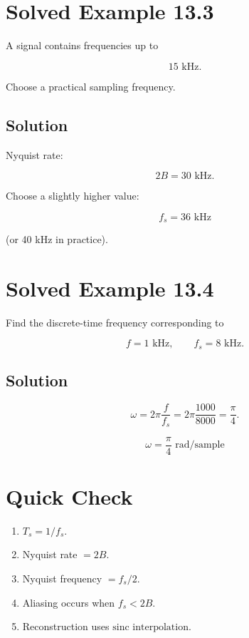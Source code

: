 \section{Solved Example 13.3}

A signal contains frequencies up to

\[
15\text{ kHz}.
\]

Choose a practical sampling frequency.


\subsection{Solution}

Nyquist rate:

\[
2B=30\text{ kHz}.
\]

Choose a slightly higher value:

\[
\boxed{
f_s=36\text{ kHz}
}
\]

(or 40 kHz in practice).


\section{Solved Example 13.4}

Find the discrete-time frequency corresponding to

\[
f=1\text{ kHz},
\qquad
f_s=8\text{ kHz}.
\]


\subsection{Solution}

\[
\omega=
2\pi\frac{f}{f_s}
=
2\pi\frac{1000}{8000}
=
\frac{\pi}{4}.
\]

\[
\boxed{
\omega=\frac{\pi}{4}\text{ rad/sample}
}
\]


\section{Quick Check}

\begin{enumerate}
\item \(T_s=\boxed{1/f_s}\).
\item Nyquist rate \(=\boxed{2B}\).
\item Nyquist frequency \(=\boxed{f_s/2}\).
\item Aliasing occurs when \(\boxed{f_s<2B}\).
\item Reconstruction uses \(\boxed{\text{sinc interpolation}}\).
\end{enumerate}

